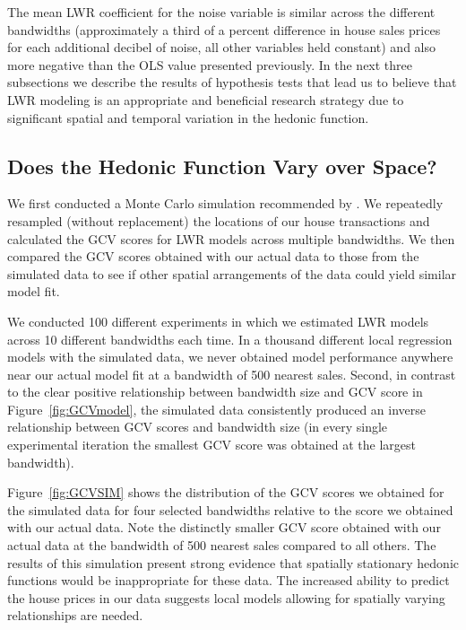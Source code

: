 \documentclass{article}\usepackage[]{graphicx}\usepackage[]{color}
\begin{document}
The mean LWR coefficient for the noise variable is similar across the different bandwidths (approximately a third of a percent difference in house sales prices for each additional decibel of noise, all other variables held constant) and also more negative than the OLS value presented previously. In the next three subsections we describe the results of hypothesis tests that lead us to believe that LWR modeling is an appropriate and beneficial research strategy due to significant spatial and temporal variation in the hedonic function. 

\subsection*{Does the Hedonic Function Vary over Space?}

We first conducted a Monte Carlo simulation recommended by \citet{Fotheringham2002}. We repeatedly resampled (without replacement) the locations of our house transactions and calculated the GCV scores for LWR models across multiple bandwidths. We then compared the GCV scores obtained with our actual data to those from the simulated data to see if other spatial arrangements of the data could yield similar model fit.  

We conducted 100 different experiments in which we estimated LWR models across 10 different bandwidths each time. In a thousand different local regression models with the simulated data, we never obtained model performance anywhere near our actual model fit at a bandwidth of 500 nearest sales. Second, in contrast to the clear positive relationship between bandwidth size and GCV score in Figure~\ref{fig:GCVmodel}, the simulated data consistently produced an inverse relationship between GCV scores and bandwidth size (in every single experimental iteration the smallest GCV score was obtained at the largest bandwidth).

Figure~\ref{fig:GCVSIM} shows the distribution of the GCV scores we obtained for the simulated data for four selected bandwidths relative to the score we obtained with our actual data. Note the distinctly smaller GCV score obtained with our actual data at the bandwidth of 500 nearest sales compared to all others. The results of this simulation present strong evidence that spatially stationary hedonic functions would be inappropriate for these data. The increased ability to predict the house prices in our data suggests local models allowing for spatially varying relationships are needed. 
\end{document}

